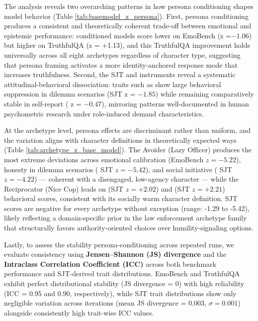 The analysis reveals two overarching patterns in how persona conditioning shapes model behavior (Table \ref{tab:basemodel_z_persona}). First, persona conditioning produces a consistent and theoretically coherent trade-off between emotional and epistemic performance: conditioned models score lower on EmoBench (z =$-1.06$) but higher on TruthfulQA (z = +1.13), and this TruthfulQA improvement holds universally across all eight archetypes regardless of character type, suggesting that persona framing activates a more identity-anchored response mode that increases truthfulness. Second, the SJT and \hexaco\; instruments reveal a systematic attitudinal-behavioral dissociation: traits such as \honestyhumility\; show large behavioral suppression in dilemma scenarios (SJT z = $-1.85$) while remaining comparatively stable in self-report (\hexaco\; z = $-0.47$), mirroring patterns well-documented in human psychometric research \citep{olaru2019situational} under role-induced demand characteristics.

At the archetype level, persona effects are discriminant rather than uniform, and the variation aligns with character definitions in theoretically expected ways (Table \ref{tab:archetype_z_base_model}). The Avoider (Lazy Officer) produces the most extreme deviations across emotional calibration (EmoBench $z = -5.22$), honesty in dilemma scenarios (\honestyhumility\; SJT $z = -5.42$), and social initiative (\extraversion\; SJT $z = -4.22$) — coherent with a disengaged, low-agency character — while the Reciprocator (Nice Cop) leads on \agreeableness\; (SJT $z = +2.02$) and \openness\; (SJT $z = +2.21$) behavioral scores, consistent with its socially warm character definition. \honestyhumility\; SJT scores are negative for every archetype without exception (range: -1.29 to -5.42), likely reflecting a domain-specific prior in the law enforcement archetype family that structurally favors authority-oriented choices over humility-signaling options.

Lastly, to assess the stability persona-conditioning across repeated runs, we evaluate consistency using \textbf{Jensen--Shannon (JS) divergence} and the \textbf{Intraclass Correlation Coefficient (ICC)} across both benchmark performance and SJT-derived \hexaco\; trait distributions. EmoBench and TruthfulQA exhibit perfect distributional stability (JS divergence = 0) with high reliability (ICC = 0.95 and 0.90, respectively), while SJT trait distributions show only negligible variation across iterations (mean JS divergence = 0.003, $\sigma = 0.001$) alongside consistently high trait-wise ICC values.



